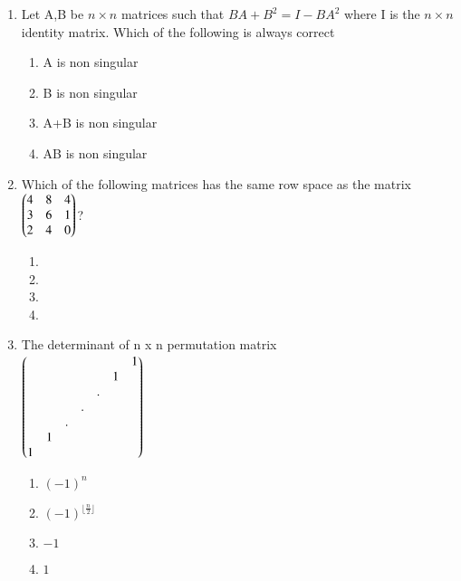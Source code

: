 \renewcommand{\theequation}{\theenumi}
\renewcommand{\thefigure}{\theenumi}
\begin{enumerate}[label=\thesection.\arabic*.,ref=\thesection.\theenumi]

\item Let A,B be $n \times n$ matrices such that $BA+ B^2= I-BA^2$ where I is the $n\times n$ identity matrix. Which of the following is always correct
\begin{enumerate}
    \item A is non singular
    \item B is non singular
    \item A+B is non singular
    \item AB is non singular
\end{enumerate}
%
%
\solution

\item Which of the following matrices has the same row space as the matrix $\begin{pmatrix}4&8&4\\3&6&1\\2&4&0\end{pmatrix}$?
\begin{enumerate}
    \item {}
    \item {}
    \item {}
    \item {}
\end{enumerate}
%
%
\item The determinant of n x n permutation matrix\\
$\begin{pmatrix} & & & & & &1\\ & & & & &1& \\ & & & &.& & \\ & & &.& & & \\ & &.& & & & \\ &1& & & & & \\1& & & & & &  \end{pmatrix}$
\begin{enumerate} %
\item $(-1)^n $
\item $(-1)^{\lfloor \frac{n}{2} \rfloor} $
\item $-1 $
\item $1$ 

\end{enumerate}
\end{enumerate}
